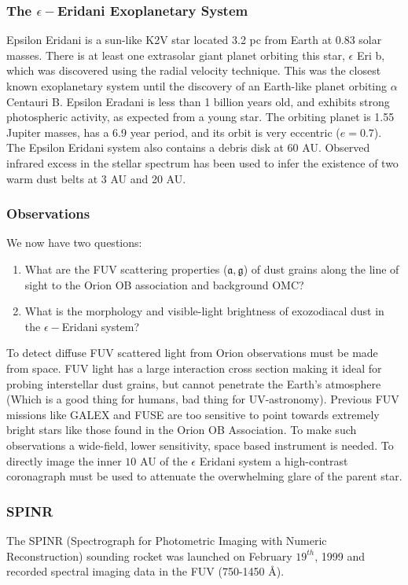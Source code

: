 \documentclass[10pt]{article}
\theoremstyle{definition}
\begin{document}
\subsubsection*{The $\epsilon-$Eridani Exoplanetary System}
Epsilon Eridani is a sun-like K2V star located 3.2 pc from Earth at 0.83 solar masses. There is at least one extrasolar giant planet orbiting this star, $\epsilon$ Eri b, which was discovered using the radial velocity technique. This was the closest known exoplanetary system until the discovery of an Earth-like planet orbiting $\alpha$ Centauri B. Epsilon Eradani is less than 1 billion years old, and exhibits strong photospheric activity, as expected from a young star. The orbiting planet is 1.55 Jupiter masses, has a 6.9 year period, and its orbit is very eccentric ($e=0.7$). The Epsilon Eridani system also contains a debris disk at 60 AU. Observed infrared excess in the stellar spectrum has been used to infer the existence of two warm dust belts at 3 AU and 20 AU. 
\subsubsection*{Observations}
We now have two questions:
\begin{enumerate}
	\item What are the FUV scattering properties ($\mathfrak{a},\mathfrak{g}$) of dust grains along the line of sight to the Orion OB association and background OMC?
	\item What is the morphology and visible-light brightness of exozodiacal dust in the $\epsilon-$Eridani system?
\end{enumerate}
To detect diffuse FUV scattered light from Orion observations must be made from space. FUV light has a large interaction cross section making it ideal for probing interstellar dust grains, but cannot penetrate the Earth's atmosphere (Which is a good thing for humans, bad thing for UV-astronomy). Previous FUV missions like GALEX and FUSE are too sensitive to point towards extremely bright stars like those found in the Orion OB Association. To make such observations a wide-field, lower sensitivity, space based instrument is needed. To directly image the inner $10$ AU of the $\epsilon$ Eridani system a high-contrast coronagraph must be used to attenuate the overwhelming glare of the parent star.
\subsubsection*{SPINR}
The SPINR (Spectrograph for Photometric Imaging with Numeric Reconstruction) sounding rocket was launched on February $19^{th}$, 1999 and recorded spectral imaging data in the FUV (750-1450 \AA).
\end{document}
